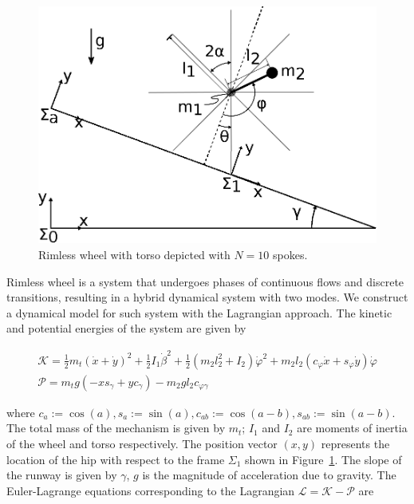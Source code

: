 \begin{figure}[b]
 \centering
 \includegraphics[width=0.75\columnwidth]{./figures/rimless_wheel_with_torso_v3.eps}
 \caption{Rimless wheel with torso depicted with $N=10$ spokes.}
 \label{fig:rimless_wheel_w_torso}
\end{figure}

Rimless wheel is a system that undergoes phases of continuous flows and discrete
transitions, resulting in a hybrid dynamical system with two modes. We construct
a dynamical model for such system with the Lagrangian approach. The kinetic and
potential energies of the system are given by

\begin{equation*}
  \begin{gathered}
    \mathcal{K} = \frac{1}{2} m_t(\dot{x} + \dot{y})^2  +  \frac{1}{2} I_1 \dot{\beta}^2  + 
                    \frac{1}{2} (m_2 l_2^2 + I_2) \dot{\varphi}^2 + m_2 l_2(c_{\varphi} \dot{x} + s_{\varphi} \dot{y}) \dot{\varphi} \\
    \mathcal{P} = m_tg(-x s_{\gamma} + y c_\gamma) - m_2 g l_2 c_{\varphi \gamma}
  \end{gathered}
\end{equation*}

\noindent where $c_a := \cos{(a)}, s_a := \sin{(a)}, c_{ab} := \cos{(a - b)},
s_{ab} := \sin{(a - b)}$. The total mass of the mechanism is given by $m_t$;
$I_1$ and $I_2$ are moments of inertia of the wheel and torso respectively. The
position vector $(x, y)$ represents the location of the hip with respect to the
frame $\Sigma_1$ shown in Figure~\ref{fig:rimless_wheel_w_torso}. The slope of
the runway is given by $\gamma$, $g$ is the magnitude of acceleration due to
gravity.
%
The Euler-Lagrange equations corresponding to the Lagrangian $\mathcal{L} =
\mathcal{K} - \mathcal{P}$ are

